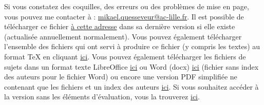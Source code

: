 Si vous constatez des coquilles, des erreurs ou des problèmes de mise en page, vous pouvez me contacter à : \href{mailto:mikael.quesseveur@ac-lille.fr}{mikael.quesseveur@ac-lille.fr}. Il est possible de télécharger ce fichier 
\href{https://drive.google.com/file/d/1PJyaKCNypSU1-v5-fRtyrf5YMxSI8puw/view?usp=drive_link}
{à cette adresse} dans sa dernière version si elle existe (actualisée annuellement normalement). Vous pouvez également télécharger l'ensemble des fichiers qui ont servi à produire ce fichier (y compris les textes) au format \TeX{} en cliquant 
\href{https://drive.google.com/drive/folders/1QwtvLY3i87WzyajRLPe0Xmmb31FK9oDp?usp=sharing}
{ici}. Vous pouvez également télécharger les fichiers de sujets dans un format texte LibreOffice 
\href{https://drive.google.com/file/d/1DnEUzL6_MTiRfS60gFycgNy-jxfQFMsu/view?usp=sharing}
{ici} ou Word (docx)
\href{https://docs.google.com/document/d/1XnJ397bNF5Vn-ZwEVjEvbJiCvbMBvRGi/edit?usp=sharing&ouid=103662385121242831300&rtpof=true&sd=true}
{ici} (fichier sans index des auteurs pour le fichier Word) ou encore une version PDF simplifiée ne contenant que les fichiers et un index des auteurs \href{https://drive.google.com/file/d/1IRRNhgu3YuUxAvOHtcaqKaeHUeaGV3Xn/view?usp=sharing}{ici}. Si vous souhaitez accéder à la version sans les éléments d'évaluation, vous la trouverez \href{https://drive.google.com/file/d/127SoEaNlMn662R3lhdlSIw74tFSGJGNQ/view?usp=drive_link}{ici}.

\bigskip

\ifgencsv
\immediate\closeout\sujetdatabase
\fi
